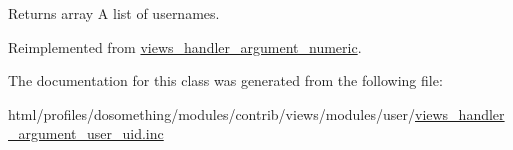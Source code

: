 \begin{DoxyReturn}{Returns}
array A list of usernames. 
\end{DoxyReturn}


Reimplemented from \hyperlink{classviews__handler__argument__numeric_a5c6f566b06bad6057e92f15d82311c7b}{views\_\-handler\_\-argument\_\-numeric}.

The documentation for this class was generated from the following file:\begin{DoxyCompactItemize}
\item 
html/profiles/dosomething/modules/contrib/views/modules/user/\hyperlink{views__handler__argument__user__uid_8inc}{views\_\-handler\_\-argument\_\-user\_\-uid.inc}\end{DoxyCompactItemize}
